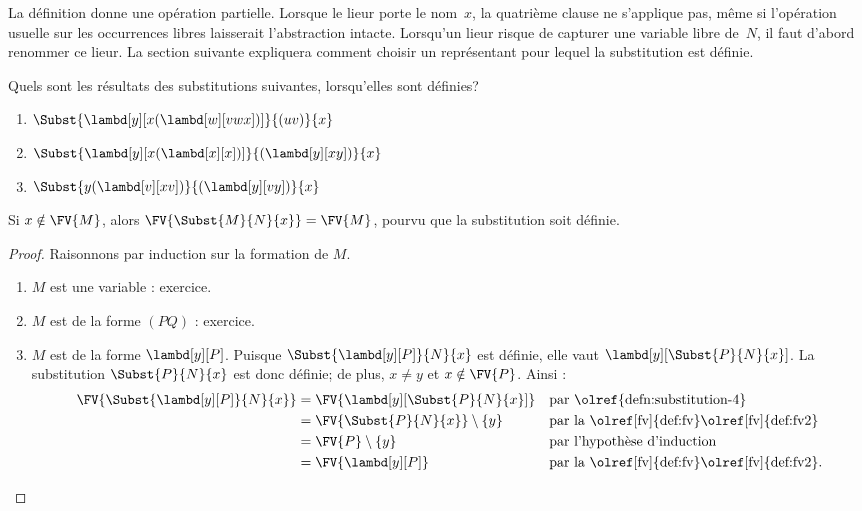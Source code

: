 \documentclass[../../../include/open-logic-section]{subfiles}
\begin{document}
\begin{explain}
La définition donne une opération partielle. Lorsque le lieur
porte le nom~$x$, la quatrième clause ne s'applique pas, même
si l'opération usuelle sur les occurrences libres laisserait
l'abstraction intacte. Lorsqu'un lieur risque de capturer une
variable libre de~$N$, il faut d'abord renommer ce lieur.
La section suivante expliquera comment choisir un représentant
pour lequel la substitution est définie.
\end{explain}

\begin{prob}
Quels sont les résultats des substitutions
suivantes, lorsqu'elles sont définies?
\begin{enumerate}
  \item $\Subst{\lambd[y][x(\lambd[w][vwx])]}{(uv)}{x}$
  \item $\Subst{\lambd[y][x(\lambd[x][x])]}{(\lambd[y][xy])}{x}$
  \item $\Subst{y(\lambd[v][xv])}{(\lambd[y][vy])}{x}$
\end{enumerate}
\end{prob}

\begin{thm} 
Si $x \notin \FV{M}$, alors
$\FV{\Subst{M}{N}{x}} = \FV{M}$,
pourvu que la substitution soit définie.
\end{thm}

\begin{proof}
Raisonnons par induction sur la formation de $M$.
\begin{enumerate}
\item $M$ est une variable : exercice.
\item $M$ est de la forme $(PQ)$ : exercice.
\item $M$ est de la forme $\lambd[y][P]$.
  Puisque $\Subst{\lambd[y][P]}{N}{x}$ est
  définie, elle vaut
  $\lambd[y][\Subst{P}{N}{x}]$.
  La substitution $\Subst{P}{N}{x}$ est donc
  définie; de plus, $x \neq y$ et
  $x \notin \FV{P}$. Ainsi :
  \begin{align*}
    \FV{\Subst{\lambd[y][P]}{N}{x}}
    &= \FV{\lambd[y][\Subst{P}{N}{x}]}
       && \text{par \olref{defn:substitution-4}}\\
    &= \FV{\Subst{P}{N}{x}} \setminus \{y\}
       && \text{par la \olref[fv]{def:fv}\olref[fv]{def:fv2}}\\
    &= \FV{P} \setminus \{y\}
       && \text{par l'hypothèse d'induction}\\
    &= \FV{\lambd[y][P]}
       && \text{par la \olref[fv]{def:fv}\olref[fv]{def:fv2}}.
  \end{align*}
\end{enumerate}
\end{proof}
\end{document}
